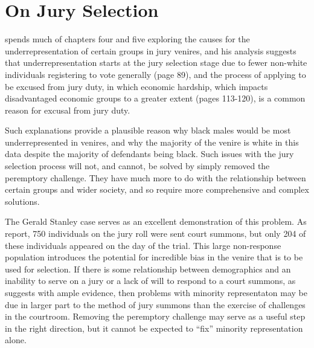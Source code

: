 \section{On Jury Selection}

\cite{vandykejurysel} spends much of chapters four and five exploring the causes for the underrepresentation of certain groups in
jury venires, and his analysis suggests that underrepresentation starts at the jury selection stage due to fewer non-white
individuals registering to vote generally (page 89), and the process of applying to be excused from jury duty, in which economic
hardship, which impacts disadvantaged economic groups to a greater extent (pages 113-120), is a common reason for excusal from
jury duty.

Such explanations provide a plausible reason why black males would be most underrepresented in venires, and why the majority of
the venire is white in this data despite the majority of defendants being black. Such issues with the jury selection process will
not, and cannot, be solved by simply removed the peremptory challenge. They have much more to do with the relationship between
certain groups and wider society, and so require more comprehensive and complex solutions.

The Gerald Stanley case serves as an excellent demonstration of this problem. As \cite{boushie750} report, 750 individuals on the
jury roll were sent court summons, but only 204 of these individuals appeared on the day of the trial. This large non-response
population introduces the potential for incredible bias in the venire that is to be used for selection. If there is some
relationship between demographics and an inability to serve on a jury or a lack of will to respond to a court summons, as
\cite{vandykejurysel} suggests with ample evidence, then problems with minority representaton may be due in larger part to the
method of jury summons than the exercise of challenges in the courtroom. Removing the peremptory challenge may serve as a useful
step in the right direction, but it cannot be expected to ``fix'' minority representation alone.